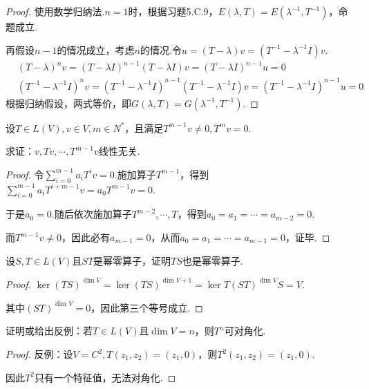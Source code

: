 \begin{proof}
    使用数学归纳法.\(n=1\)时，根据习题5.C.9，\(E(\lambda,T)=E(\lambda^{-1},T^{-1})\)，命题成立.
    
    再假设\(n-1\)的情况成立，考虑\(n\)的情况.令\(u=(T-\lambda)v=(T^{-1}-\lambda^{-1} I)v\).
    \begin{align*}
        &(T-\lambda)^n v=(T-\lambda I)^{n-1}(T-\lambda I)v=(T-\lambda I)^{n-1}u=0 \\
        &(T^{-1}-\lambda^{-1} I)^n v=(T^{-1}-\lambda^{-1} I)^{n-1}(T^{-1}-\lambda^{-1} I)v
            =(T^{-1}-\lambda^{-1} I)^{n-1}u=0
    \end{align*}
    根据归纳假设，两式等价，即\(G(\lambda,T)=G(\lambda^{-1},T^{-1})\).
\end{proof}

\begin{problem}[5]\label{8.A.5}
    设\(T \in L(V),v \in V,m \in N^*\)，且满足\(T^{m-1}v \ne 0,T^m v=0\).
    
    求证：\(v,Tv,\cdots,T^{m-1}v\)线性无关.
\end{problem}

\begin{proof}
    令\(\sum_{i=0}^{m-1} a_iT^i v=0\).施加算子\(T^{m-1}\)，得到\(\sum_{i=0}^{m-1} a_iT^{i+m-1} v=a_0T^{m-1} v=0\).
    
    于是\(a_0=0\).随后依次施加算子\(T^{m-2},\cdots,T\)，得到\(a_0=a_1=\cdots=a_{m-2}=0\).
    
    而\(T^{m-1}v \ne 0\)，因此必有\(a_{m-1}=0\)，从而\(a_0=a_1=\cdots=a_{m-1}=0\)，证毕.
\end{proof}

\begin{problem}[9]\label{8.A.9}
    设\(S,T \in L(V)\)且\(ST\)是幂零算子，证明\(TS\)也是幂零算子.
\end{problem}

\begin{proof}
    \(\ker (TS)^{\dim V}=\ker (TS)^{\dim V+1}=\ker T(ST)^{\dim V}S=V\).

    其中\((ST)^{\dim V}=0\)，因此第三个等号成立.
\end{proof}

\begin{problem}[11]\label{8.A.11}
    证明或给出反例：若\(T \in L(V)\)且\(\dim V=n\)，则\(T^n\)可对角化.
\end{problem}

\begin{proof}
    反例：设\(V=C^2,T(z_1,z_2)=(z_1,0)\)，则\(T^2(z_1,z_2)=(z_1,0)\).

    因此\(T^2\)只有一个特征值，无法对角化.
\end{proof}

